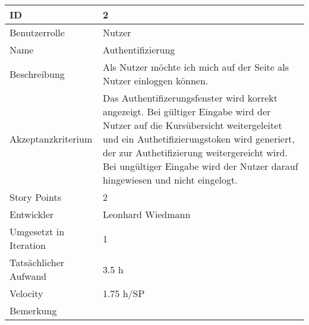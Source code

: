 \begin{tabularx}{\textwidth}{|p{}|X|}
	\hline
	ID & 2\\
	\hline
	Benutzerrolle & Nutzer\\
	\hline
	Name & Authentifizierung\\
	\hline
	Beschreibung & Als Nutzer möchte ich mich auf der Seite als Nutzer einloggen können.\\
	\hline
	Akzeptanzkriterium & Das Authentifizerungsfenster wird korrekt angezeigt. Bei gültiger Eingabe wird der Nutzer auf die Kursübersicht weitergeleitet und ein Authetifizierungstoken wird generiert, der zur Authetifizierung weitergereicht wird. Bei ungültiger Eingabe wird der Nutzer darauf hingewiesen und nicht eingelogt.\\
	\hline
	Story Points & 2 \\
	\hline
	Entwickler & Leonhard Wiedmann\\
	\hline
	Umgesetzt in Iteration & 1\\
	\hline
	Tatsächlicher Aufwand & 3.5 h\\
	\hline
	Velocity & 1.75 h/SP\\
	\hline
	Bemerkung & \\
	\hline
\end{tabularx}
\vspace{20pt}
